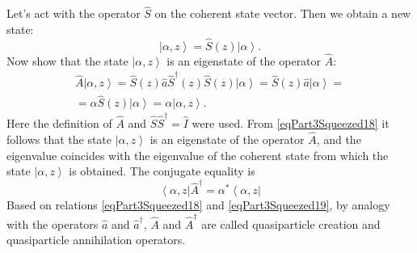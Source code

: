 Let's act with the operator $\hat{S}$ on the coherent state vector. Then
we obtain a new state:
\begin{equation}
\left|\alpha, z\right> = \hat{S}\left(z\right)\left|\alpha\right>.
\label{eqPart3Squeezed17}
\end{equation}
Now show that the state $\left|\alpha, z\right>$ is an eigenstate of the operator $\hat{A}$:
\begin{eqnarray}
\hat{A}\left|\alpha, z\right> = 
\hat{S}\left(z\right)\hat{a}\hat{S}^{\dag}\left(z\right)\hat{S}\left(z\right)\left|\alpha\right>
= 
\hat{S}\left(z\right)\hat{a}\left|\alpha\right> = 
\nonumber \\
= \alpha \hat{S}\left(z\right)\left|\alpha\right> = 
\alpha \left|\alpha, z\right>.
\label{eqPart3Squeezed18}
\end{eqnarray}
Here the definition of $\hat{A}$ and $\hat{S}\hat{S}^{\dag} = \hat{I}$ were used.
From \eqref{eqPart3Squeezed18} it follows that the state $\left|\alpha, z\right>$ is
an eigenstate of the operator $\hat{A}$, and the eigenvalue coincides with
the eigenvalue of the coherent state from which
the state $\left|\alpha, z\right>$ is obtained.
The conjugate equality is
\begin{equation}
\left<\alpha, z\right|\hat{A}^{\dag} = 
\alpha^{*}\left<\alpha, z\right|
\label{eqPart3Squeezed19}
\end{equation}
Based on relations \eqref{eqPart3Squeezed18} and
\eqref{eqPart3Squeezed19}, by analogy with the operators $\hat{a}$ and
$\hat{a}^{\dag}$, $\hat{A}$ and $\hat{A}^{\dag}$ are called quasiparticle creation and quasiparticle annihilation operators.

